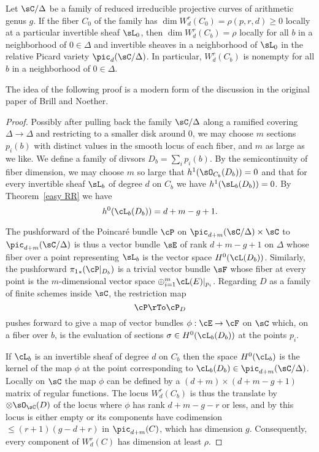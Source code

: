 \begin{theorem}\label{local existence}
Let $\sC/\Delta$ be a family of reduced irreducible projective curves of arithmetic genus $g$. If
the fiber  $C_0$ of the family has $\dim W^r_d(C_0) = \rho(p,r,d) \geq 0$
locally at a particular invertible sheaf $\sL_{0}$,  then $\dim W^r_d(C_b) = \rho$ locally for all $b$ in a neighborhood of $0 \in \Delta$ and invertible sheaves in a neighborhood of $\sL_{0}$
in the relative Picard variety $\pic_{d}(\sC/\Delta)$. In particular, $W^r_d(C_b)$ is nonempty for all $b$ in a neighborhood of $0 \in \Delta$.
\end{theorem}

The idea of the following proof is a modern form of the discussion in the original paper of Brill and Noether. 

\begin{proof}  Possibly after pulling back the family $\sC/\Delta$ along a ramified covering $\Delta\to \Delta$
and restricting to a smaller disk around 0, we may choose $m$ sections
$p_{i}(b)$ with distinct values in the smooth locus of each fiber, and $m$ as large as we like. We 
define a family of divsors $D_{b} = \sum_{i}p_{i}(b)$.
By the semicontinuity of fiber dimension, we may choose $m$ so large that $h^{1}(\sO_{C_{b}}(D_{b})) = 0$
and that for every invertible sheaf $\sL_{b}$ of degree $d$ on $C_{b}$ we have
$h^{1}(\sL_{b}(D_{b})) = 0$. 
By Theorem~\ref{easy RR} we have
$$
h^0(\cL_{b}(D_{b})) =  d+m - g + 1.
$$

The pushforward of the Poincar\'e bundle $\cP$ on $\pic_{d+m}(\sC/\Delta) \times \sC$ to $\pic_{d+m}(\sC/\Delta)$ is thus a vector
bundle $\sE$ of rank $d + m - g + 1$ on $\Delta$ whose fiber over a point representing $\sL_{b}$ is the vector space $H^0(\cL(D_{b}))$. Similarly,
the pushforward 
${\pi_1}_*(\cP|_{D_{b}})$
is a trivial vector bundle $\sF$ whose fiber at every point is the $m$-dimensional vector space $\oplus_{i = 1}^{m} \cL(E)|_{p_i}$. Regarding $D$ as a family of finite schemes inside $\sC$, the restriction map
$$
\cP  \rTo \cP_{D}
$$
pushes forward to give a map of vector bundles $\phi : \cE \to \cF$ on $\sC$ which, on a fiber over $b$, is the evaluation of sections $\sigma \in H^0(\cL_{b}(D_{b}))$ at the points $p_i$.

If $\cL_{b}$ is an invertible sheaf of degree $d$ on $C_{b}$ then the space $H^0(\cL_{b})$ is the kernel of the map $\phi$ at the point corresponding to $\cL_{b}(D_{b}) \in \pic_{d+m}(\sC/\Delta)$. Locally on $\sC$ the map $\phi$ can be defined by a $(d+m) \times (d+m-g+1)$ matrix of regular functions. The locus $W^r_d(C_{b})$ is 
thus the translate
by $\otimes \sO_{\sC}(D)$ of the locus where $\phi$ has rank $d+m-g-r$ or less, and by \cite[Exercise 10.9]{Eisenbud1995} this locus is either empty or its components have codimension $\leq (r+1)(g-d+r)$ in $\pic_{d+m}(C)$, which has dimension $g$. Consequently, every component of $W^r_d(C)$ has dimension at least $\rho$. 
\end{proof}

